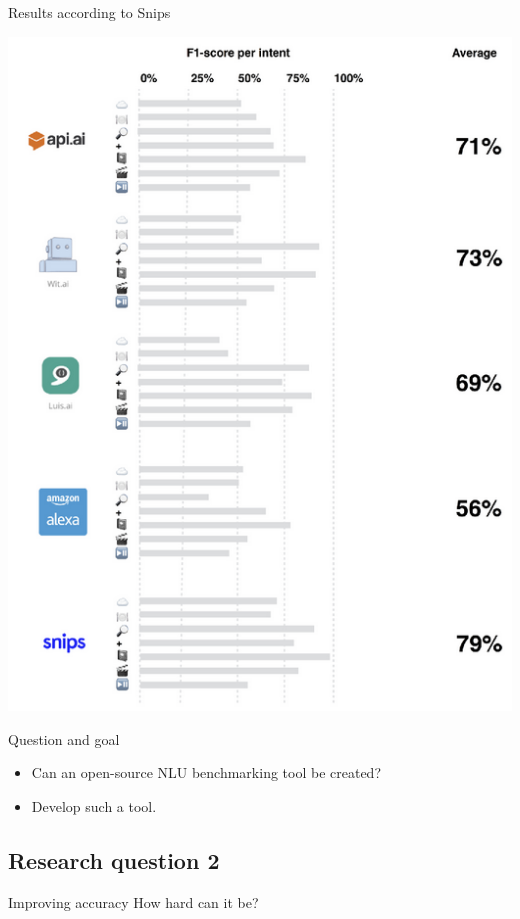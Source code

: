\documentclass[pdf]{beamer}
\begin{document}
\begin{frame}{Results according to Snips}
  \begin{center}
\includegraphics[height=0.85\textheight]{figures/snips_own_benchmark.png}
  \end{center}
\end{frame}

\begin{frame}{Question and goal}
  \begin{itemize}
  \item Can an open-source NLU benchmarking tool be created?
  \item Develop such a tool.
  \end{itemize}
\end{frame}

\subsection{Research question 2}
\begin{frame}{Improving accuracy}
 How hard can it be? 
\end{frame}
\end{document}
